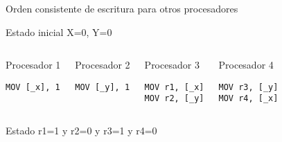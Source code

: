 \begin{frame}[t,fragile]{Orden consistente de escritura para otros procesadores}

\begin{block}{Estado inicial}
X=0, Y=0
\end{block}


\begin{columns}[T]


\begin{block}{\small Procesador 1}
\begin{lstlisting}[language={[x86masm]Assembler}]
MOV [_x], 1
\end{lstlisting}
\end{block}

\begin{block}{\small Procesador 2}
\begin{lstlisting}[language={[x86masm]Assembler}]
MOV [_y], 1
\end{lstlisting}
\end{block}

\begin{block}{\small Procesador 3}
\begin{lstlisting}[language={[x86masm]Assembler}]
MOV r1, [_x]
MOV r2, [_y]
\end{lstlisting}
\end{block}

\begin{block}{\small Procesador 4}
\begin{lstlisting}[language={[x86masm]Assembler}]
MOV r3, [_y]
MOV r4, [_x]
\end{lstlisting}
\end{block}

\end{columns}


\begin{block}{Estado }
r1=1 y r2=0 y r3=1 y r4=0
\end{block}

\end{frame}


